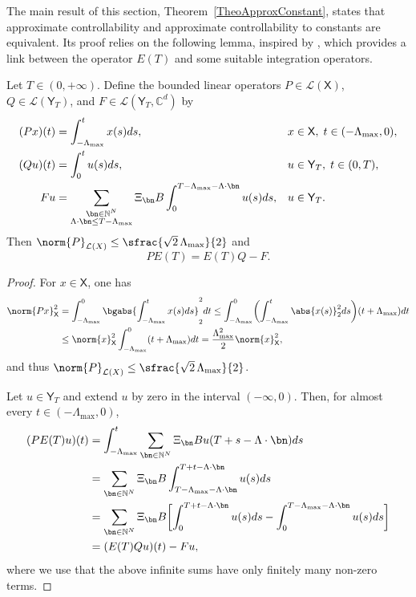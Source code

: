 The main result of this section, Theorem~\ref{TheoApproxConstant}, states that approximate controllability and approximate controllability to constants are equivalent. Its proof relies on the following lemma, inspired by \cite[Th.\,5.1]{Gohberg1989Inversion}, which provides a link between the operator $E(T)$ and some suitable integration operators.

\begin{lemm}
\label{LemmPETETQF}
Let $T \in (0, +\infty)$. Define the bounded linear operators $P \in \mathcal L(\mathsf X)$, $Q \in \mathcal L(\mathsf Y_T)$, and $F \in \mathcal L(\mathsf Y_T, \mathbb C^d)$ by
\begin{align*}
(P x)(t) & = \int_{-\Lambda_{\max}}^t x(s) ds, & & x \in \mathsf X,\; t \in (-\Lambda_{\max}, 0),  \\
(Q u)(t) & = \int_0^t u(s) ds, & & u \in \mathsf Y_T,\; t \in (0, T),  \\
F u & = \sum_{\substack{\bn \in \mathbb N^N \\ \Lambda \cdot \bn \leq T - \Lambda_{\max}}} \Xi_{\bn} B \int_0^{T - \Lambda_{\max} - \Lambda \cdot \bn} u(s) ds, & & u \in \mathsf Y_T.
\end{align*}
Then $\norm{P}_{\mathcal L(X)} \leq \sfrac{\sqrt{2}\,\Lambda_{\max}}{2}$ and
\begin{equation}
\label{EqPETETQF}
P E(T) = E(T) Q - F.
\end{equation}
\end{lemm}

\begin{proof}
For $x \in \mathsf X$, one has
\begin{align*}
\norm{P x}_{\mathsf X}^2 & = \int_{-\Lambda_{\max}}^0 \bgabs{\int_{-\Lambda_{\max}}^t x(s) ds}_2^2 dt \leq \int_{-\Lambda_{\max}}^0 \biggl(\int_{-\Lambda_{\max}}^t \abs{x(s)}_2^2 ds\biggr) (t + \Lambda_{\max}) dt  \\
& \leq \norm{x}_{\mathsf X}^2 \int_{-\Lambda_{\max}}^0 (t + \Lambda_{\max}) dt = \frac{\Lambda_{\max}^2}{2} \norm{x}_{\mathsf X}^2,
\end{align*}
and thus $\norm{P}_{\mathcal L(X)} \leq \sfrac{\sqrt{2}\,\Lambda_{\max}}{2}$.

Let $u \in \mathsf Y_T$ and extend $u$ by zero in the interval $(-\infty, 0)$. Then, for almost every $t \in (-\Lambda_{\max}, 0)$,
\begin{align*}
(P E(T) u)(t) & = \int_{-\Lambda_{\max}}^t \sum_{\bn \in \mathbb N^N} \Xi_{\bn} B u(T + s - \Lambda \cdot \bn) ds  \\
& = \sum_{\bn \in \mathbb N^N} \Xi_{\bn} B \int_{T - \Lambda_{\max} - \Lambda \cdot \bn}^{T + t - \Lambda \cdot \bn} u(s) ds  \\
& = \sum_{\bn \in \mathbb N^N} \Xi_{\bn} B \biggl[\int_0^{T + t - \Lambda \cdot \bn} u(s) ds - \int_0^{T - \Lambda_{\max} - \Lambda \cdot \bn} u(s) ds\biggr]  \\
& = (E(T) Q u)(t) - F u,
\end{align*}
where we use that the above infinite sums have only finitely many non-zero terms.
\end{proof}


